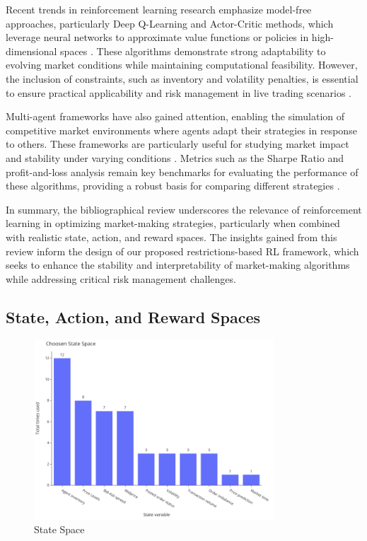 Recent trends in reinforcement learning research emphasize model-free approaches, particularly Deep Q-Learning and Actor-Critic methods,
which leverage neural networks to approximate value functions or policies in high-dimensional spaces \cite{patel2018optimizing, ganesh2019reinforcement}.
These algorithms demonstrate strong adaptability to evolving market conditions while maintaining computational feasibility.
However, the inclusion of constraints, such as inventory and volatility penalties,
is essential to ensure practical applicability and risk management in live trading scenarios \cite{jerome2022modelbased, selser2021optimal}.

Multi-agent frameworks have also gained attention, enabling the simulation of competitive market environments where agents adapt their strategies in response to others.
These frameworks are particularly useful for studying market impact and stability under varying conditions \cite{ganesh2019reinforcement, jericevich2021simulation}.
Metrics such as the Sharpe Ratio and profit-and-loss analysis remain key benchmarks for evaluating the performance of these algorithms,
providing a robust basis for comparing different strategies \cite{bakshaev2020marketmaking, he2023integrating}.

In summary, the bibliographical review underscores the relevance of reinforcement learning in optimizing market-making strategies,
particularly when combined with realistic state, action, and reward spaces.
The insights gained from this review inform the design of our proposed restrictions-based RL framework,
which seeks to enhance the stability and interpretability of market-making algorithms while addressing critical risk management challenges.

\subsection{State, Action, and Reward Spaces}
\begin{figure}[H]
    \centering
    \includegraphics[width=0.8\textwidth]{images/state_space}
    \caption{State Space}
    \label{fig:state-space}
\end{figure}

